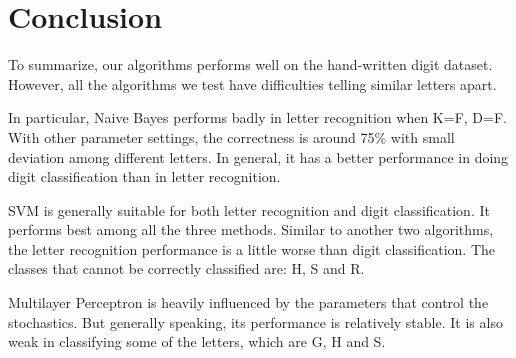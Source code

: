 \documentclass[11pt]{article}
\begin{document}
\section{Conclusion}
To summarize, our algorithms performs well on the hand-written digit dataset. However, all the algorithms we test have difficulties telling similar letters apart.

In particular, Naive Bayes performs badly in letter recognition when K=F, D=F. With other parameter settings, the correctness is around 75\% with small deviation among different letters. In general, it has a better performance in doing digit classification than in letter recognition.

SVM is generally suitable for both letter recognition and digit classification. It performs best among all the three methods. Similar to another two algorithms, the letter recognition performance is a little worse than digit classification. The classes that cannot be correctly classified are: H, S and R.

Multilayer Perceptron is heavily influenced by the parameters that control the stochastics. But generally speaking, its performance is relatively stable. It is also weak in classifying some of the letters, which are G, H and S.

\newpage


\end{document}
